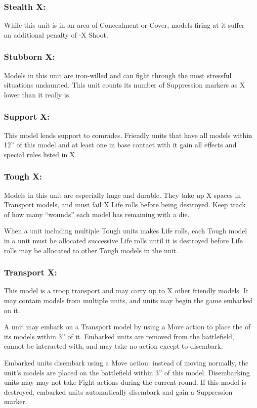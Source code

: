 \begin{multicols}{2}
\subsubsection*{Stealth X:} While this unit is in an area of Concealment or Cover, models firing at it suffer an additional penalty of -X Shoot.

\subsubsection*{Stubborn X:} Models in this unit are iron-willed and can fight through the most stressful situations undaunted. This unit counts its number of Suppression markers as X lower than it really is.

\subsubsection*{Support X:} This model lends support to comrades. Friendly units that have all models within 12'' of this model and at least one in base contact with it gain all effects and special rules listed in X.

\subsubsection*{Tough X:} Models in this unit are especially huge and durable. They take up X spaces in Transport models, and must fail X Life rolls before being destroyed. Keep track of how many ``wounds'' each model has remaining with a die.

When a unit including multiple Tough units makes Life rolls, each Tough model in a unit must be allocated successive Life rolls until it is destroyed before Life rolls may be allocated to other Tough models in the unit.

\subsubsection*{Transport X:} This model is a troop transport and may carry up to X other friendly models. It may contain models from multiple units, and units may begin the game embarked on it.

A unit may embark on a Transport model by using a Move action to place the of its models within 3'' of it. Embarked units are removed from the battlefield, cannot be interacted with, and may take no action except to disembark.

Embarked units disembark using a Move action: instead of moving normally, the unit's models are placed on the battlefield within 3'' of this model. Disembarking units may may not take Fight actions during the current round. If this model is destroyed, embarked units automatically disembark and gain a Suppression marker.


\end{multicols}
